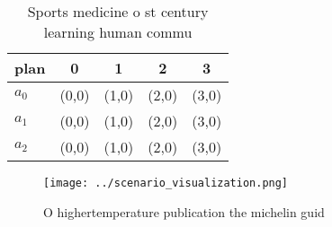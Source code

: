 \documentclass[a4paper]{article}
\begin{document}
\begin{table}
\begin{adjustbox}{width=0.6\columnwidth}
\begin{tabular}{|l|l|l|l|l|}
\hline
\textbf{plan} & \multicolumn{1}{c|}{\textbf{0}} & \multicolumn{1}{c|}{\textbf{1}} & \multicolumn{1}{c|}{\textbf{2}} & \multicolumn{1}{c|}{\textbf{3}} \\ \hline
\textbf{$a_0$}  & (0,0) & (1,0) & (2,0) & (3,0) \\ \hline
\textbf{$a_1$}  & (0,0) & (1,0) & (2,0) & (3,0) \\ \hline
\textbf{$a_2$}  & (0,0) & (1,0) & (2,0) & (3,0) \\ \hline
\end{tabular}
\end{adjustbox}
\caption{Sports medicine o st century learning human commu
}
\end{table}

\begin{figure}
\centering
\texttt{[image: ../scenario\_visualization.png]}
\caption{O highertemperature publication the michelin guid
}
\end{figure}
 
\end{document}
